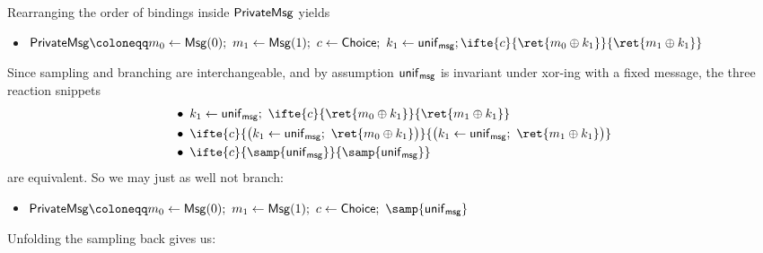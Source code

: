 \noindent Rearranging the order of bindings inside $\mathsf{PrivateMsg}$ yields
\begin{itemize}
\item $\PrivateMsg \coloneqq m_0 \leftarrow \Msg(0); \ m_1 \leftarrow \Msg(1); \ c \leftarrow \Choice; \ k_1 \leftarrow \unif_\msg; \\ \ifte{c}{\ret{m_0 \oplus k_1}}{\ret{m_1 \oplus k_1}}$
\end{itemize}
Since sampling and branching are interchangeable, and by assumption $\mathsf{unif}_{\mathsf{msg}}$ is invariant under xor-ing with a fixed message, the three reaction snippets
\begin{align*}
& \bullet \; k_1 \leftarrow \unif_\msg; \ \ifte{c}{\ret{m_0 \oplus k_1}}{\ret{m_1 \oplus k_1}} \\
& \bullet \; \ifte{c}{\big(k_1 \leftarrow \unif_\msg; \ \ret{m_0 \oplus k_1}\big)}{\big(k_1 \leftarrow \unif_\msg; \ \ret{m_1 \oplus k_1}\big)} \\
& \bullet \; \ifte{c}{\samp{\unif_\msg}}{\samp{\unif_\msg}}
\end{align*}
are equivalent. So we may just as well not branch:
\begin{itemize}
\item $\PrivateMsg \coloneqq m_0 \leftarrow \Msg(0); \ m_1 \leftarrow \Msg(1); \ c \leftarrow \Choice; \ \samp{\unif_\msg}$
\end{itemize}
Unfolding the sampling back gives us:

